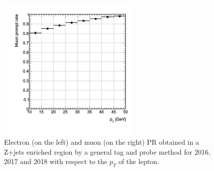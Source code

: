 \documentclass[a4paper, 10pt, openright]{report}
\begin{document}
\begin{figure}[htbp]
{\begin{minipage}[b]{.48\textwidth}
\end{minipage}\hfill
\begin{minipage}[b]{.48\textwidth}
\includegraphics[width=7cm, height=7cm]{figs/Muon_PR_pt_2017.png}
\end{minipage} \hfill
}
\caption{Electron (on the left) and muon (on the right) \ac{PR} obtained in a Z+jets enriched region by a general tag and probe method for 2016, 2017 and 2018 with respect to the $p_T$ of the lepton.}
\label{fig:PR}
\end{figure}
\end{document}
